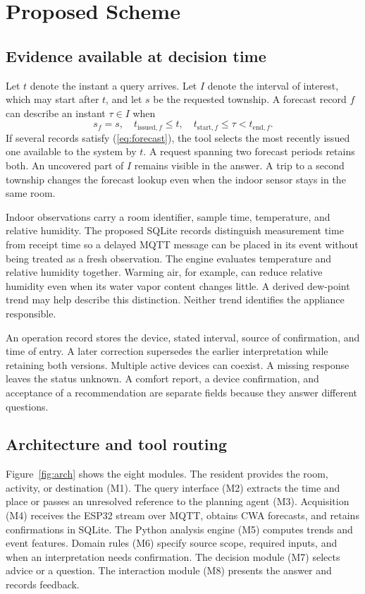 \section{Proposed Scheme}\label{sec:method}
\subsection{Evidence available at decision time}
Let $t$ denote the instant a query arrives. Let $I$ denote the interval of interest, which may start after $t$, and let $s$ be the requested township. A forecast record $f$ can describe an instant $\tau\in I$ when
\begin{equation}
s_f=s,\quad t_{\mathrm{issued},f}\leq t,\quad
t_{\mathrm{start},f}\leq\tau<t_{\mathrm{end},f}.
\label{eq:forecast}
\end{equation}
If several records satisfy (\ref{eq:forecast}), the tool selects the most recently issued one available to the system by $t$. A request spanning two forecast periods retains both. An uncovered part of $I$ remains visible in the answer. A trip to a second township changes the forecast lookup even when the indoor sensor stays in the same room.

Indoor observations carry a room identifier, sample time, temperature, and relative humidity. The proposed SQLite records distinguish measurement time from receipt time so a delayed MQTT message can be placed in its event without being treated as a fresh observation. The engine evaluates temperature and relative humidity together. Warming air, for example, can reduce relative humidity even when its water vapor content changes little. A derived dew-point trend may help describe this distinction. Neither trend identifies the appliance responsible.

An operation record stores the device, stated interval, source of confirmation, and time of entry. A later correction supersedes the earlier interpretation while retaining both versions. Multiple active devices can coexist. A missing response leaves the status unknown. A comfort report, a device confirmation, and acceptance of a recommendation are separate fields because they answer different questions.

\subsection{Architecture and tool routing}
Figure~\ref{fig:arch} shows the eight modules. The resident provides the room, activity, or destination (M1). The query interface (M2) extracts the time and place or passes an unresolved reference to the planning agent (M3). Acquisition (M4) receives the ESP32 stream over MQTT, obtains CWA forecasts, and retains confirmations in SQLite. The Python analysis engine (M5) computes trends and event features. Domain rules (M6) specify source scope, required inputs, and when an interpretation needs confirmation. The decision module (M7) selects advice or a question. The interaction module (M8) presents the answer and records feedback.

